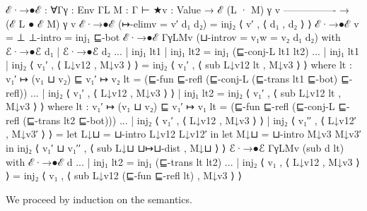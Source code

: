 \begin{fence}
\begin{code}
ℰ·→●ℰ : ∀{Γ}{γ : Env Γ}{L M : Γ ⊢ ★}{v : Value}
  → ℰ (L · M) γ v
    ----------------
  → (ℰ L ● ℰ M) γ v
ℰ·→●ℰ (↦-elim{v = v′} d₁ d₂) = inj₂ ⟨ v′ , ⟨ d₁ , d₂ ⟩ ⟩
ℰ·→●ℰ {v = ⊥} ⊥-intro = inj₁ ⊑-bot
ℰ·→●ℰ {Γ}{γ}{L}{M}{v} (⊔-intro{v = v₁}{w = v₂} d₁ d₂)
    with ℰ·→●ℰ d₁ | ℰ·→●ℰ d₂
... | inj₁ lt1 | inj₁ lt2 = inj₁ (⊑-conj-L lt1 lt2)
... | inj₁ lt1 | inj₂ ⟨ v₁′ , ⟨ L↓v12 , M↓v3 ⟩ ⟩ =
      inj₂ ⟨ v₁′ , ⟨ sub L↓v12 lt , M↓v3 ⟩ ⟩
      where lt : v₁′ ↦ (v₁ ⊔ v₂) ⊑ v₁′ ↦ v₂
            lt = (⊑-fun ⊑-refl (⊑-conj-L (⊑-trans lt1 ⊑-bot) ⊑-refl))
... | inj₂ ⟨ v₁′ , ⟨ L↓v12 , M↓v3 ⟩ ⟩ | inj₁ lt2 =
      inj₂ ⟨ v₁′ , ⟨ sub L↓v12 lt , M↓v3 ⟩ ⟩
      where lt : v₁′ ↦ (v₁ ⊔ v₂) ⊑ v₁′ ↦ v₁
            lt = (⊑-fun ⊑-refl (⊑-conj-L ⊑-refl (⊑-trans lt2 ⊑-bot)))
... | inj₂ ⟨ v₁′ , ⟨ L↓v12 , M↓v3 ⟩ ⟩ | inj₂ ⟨ v₁′′ , ⟨ L↓v12′ , M↓v3′ ⟩ ⟩ =
      let L↓⊔ = ⊔-intro L↓v12 L↓v12′ in
      let M↓⊔ = ⊔-intro M↓v3 M↓v3′ in
      inj₂ ⟨ v₁′ ⊔ v₁′′ , ⟨ sub L↓⊔ ⊔↦⊔-dist , M↓⊔ ⟩ ⟩
ℰ·→●ℰ {Γ}{γ}{L}{M}{v} (sub d lt)
    with ℰ·→●ℰ d
... | inj₁ lt2 = inj₁ (⊑-trans lt lt2)
... | inj₂ ⟨ v₁ , ⟨ L↓v12 , M↓v3 ⟩ ⟩ =
      inj₂ ⟨ v₁ , ⟨ sub L↓v12 (⊑-fun ⊑-refl lt) , M↓v3 ⟩ ⟩
\end{code}
\end{fence}

We proceed by induction on the semantics.

